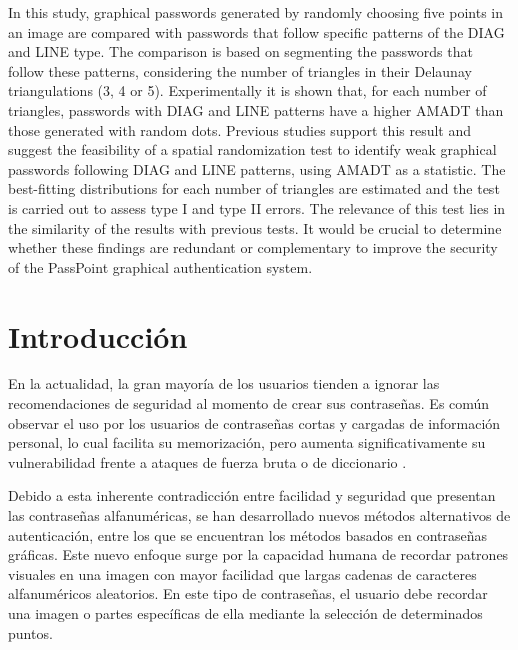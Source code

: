 \documentclass[12pt]{report}
\begin{document}
	In this study, graphical passwords generated by randomly choosing five points in an image are compared with passwords that follow specific patterns of the DIAG and LINE type. The comparison is based on segmenting the passwords that follow these patterns, considering the number of triangles in their Delaunay triangulations (3, 4 or 5). Experimentally it is shown that, for each number of triangles, passwords with DIAG and LINE patterns have a higher AMADT than those generated with random dots. Previous studies support this result and suggest the feasibility of a spatial randomization test to identify weak graphical passwords following DIAG and LINE patterns, using AMADT as a statistic. The best-fitting distributions for each number of triangles are estimated and the test is carried out to assess type I and type II errors.
	The relevance of this test lies in the similarity of the results with previous tests. It would be crucial to determine whether these findings are redundant or complementary to improve the security of the PassPoint graphical authentication system.

\tableofcontents
\newpage
\listoffigures
\newpage
\listoftables


\chapter*{Introducción}
\hypertarget{introduccion}{}


	En la actualidad, la gran mayoría de los usuarios tienden a ignorar las recomendaciones de seguridad al momento de crear sus contraseñas. Es común observar el uso por los usuarios de contraseñas cortas y cargadas de información personal, lo cual facilita su memorización, pero aumenta significativamente su vulnerabilidad frente a ataques de fuerza bruta o de diccionario \cite{1,2,3,4}.
	
	Debido a esta inherente contradicción entre facilidad y seguridad que presentan las contraseñas alfanuméricas, se han desarrollado nuevos métodos alternativos de autenticación, entre los que se encuentran los métodos basados  en contraseñas gráficas. Este nuevo enfoque surge por la capacidad humana de recordar patrones visuales en una imagen con mayor facilidad que largas cadenas de caracteres alfanuméricos aleatorios. En este tipo de contraseñas, el usuario debe recordar una imagen o partes específicas de ella mediante la selección  de determinados puntos.
	
\end{document}
